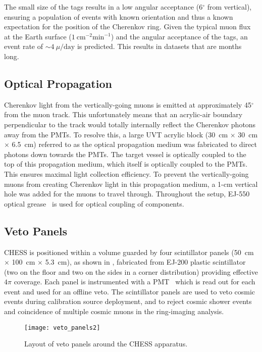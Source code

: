 The small size of the tags results in a low angular acceptance (6$^{\circ}$ from vertical), ensuring a population of events with known orientation and thus a known expectation for the position of the Cherenkov ring.  
Given the typical muon flux at the Earth surface ($1~\mbox{cm}^{-2}\mbox{min}^{-1}$) and the angular acceptance of the tags, an event rate of $\sim4~\mu / \mbox{day}$ is predicted.
This results in datasets that are months long.

\subsection{Optical Propagation}

Cherenkov light from the vertically-going muons is emitted at approximately 45$^{\circ}$from the muon track.
This unfortunately means that an acrylic-air boundary perpendicular to the track would totally internally reflect the Cherenkov photons away from the PMTs.
To resolve this, a large UVT acrylic block (30~cm $\times$ 30~cm $\times$ 6.5~cm) referred to as the optical propagation medium was fabricated to direct photons down towards the PMTs.
The target vessel is optically coupled to the top of this propagation medium, which itself is optically coupled to the PMTs.
This ensures maximal light collection efficiency.
To prevent the vertically-going muons from creating Cherenkov light in this propagation medium, a 1-cm vertical hole was added for the muons to travel through.
Throughout the setup, EJ-550 optical grease~\cite{ej550} is used for optical coupling of components. 

\subsection{Veto Panels}\label{s:veto}

CHESS is positioned within a volume guarded by four scintillator panels (50~cm $\times$ 100~cm $\times$ 5.3~cm), as shown in , fabricated from EJ-200 plastic scintillator~\cite{ej200} (two on the floor and two on the sides in a corner distribution) providing effective $4\pi$ coverage. 
Each panel is instrumented with a PMT~\cite{9102ksb} which is read out for each event and used for an offline veto. The scintillator panels are used to veto cosmic events during calibration source deployment, and to reject cosmic shower events and coincidence of multiple cosmic muons in the ring-imaging analysis. 

\begin{figure}
\centering
\texttt{[image: veto\_panels2]}
\caption{Layout of veto panels around the CHESS apparatus. }
\label{f:veto}
\end{figure}


